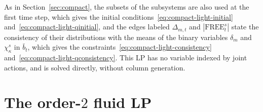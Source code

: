 \documentclass{article}
\begin{document}
As in Section~\ref{sec:compact}, the subsets of the subsystems are also used at the first time step, which gives the
initial conditions~\eqref{eq:compact-light-initial} and~\eqref{eq:compact-light-qinitial}, and the edges labeled
$\Delta_{m,t}$ and $|\text{FREE}^s_t|$ state the consistency of their distributions with the means of the binary
variables $\delta_m$ and $\chi^s_\kappa$ in $\bar b_t$, which gives the
constraints~\eqref{eq:compact-light-consistency} and~\eqref{eq:compact-light-qconsistency}. This LP has no variable
indexed by joint actions, and is solved directly, without column generation.

\section{The order-$2$ fluid LP}
\label{app:order-2}
\end{document}
